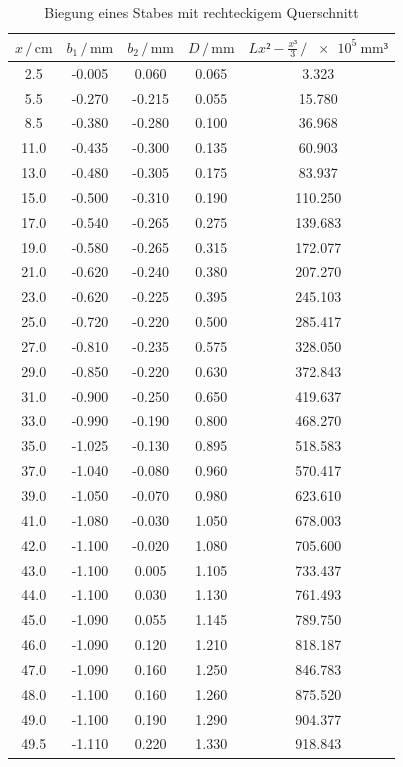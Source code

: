 \begin{table}
\centering
\caption{Biegung eines Stabes mit rechteckigem Querschnitt}
\label{tab:Messdaten1}
\begin{tabular}{c c c c c}
\toprule
$x \,/\, \si{\centi\meter}$ & $b_1 \,/\, \si{\milli\meter}$ & 
$b_2 \,/\, \si{\milli\meter}$ & $D \,/\, \si{\milli\meter}$ &
$Lx²-\frac{x³}{3} \,/\, \SI{e5}{\milli\meter³}$\\
\midrule
 2.5 & -0.005 & 0.060  & 0.065 &   3.323\\
 5.5 & -0.270 & -0.215 & 0.055 &  15.780\\
 8.5 & -0.380 & -0.280 & 0.100 &  36.968\\
11.0 & -0.435 & -0.300 & 0.135 &  60.903\\
13.0 & -0.480 & -0.305 & 0.175 &  83.937\\
15.0 & -0.500 & -0.310 & 0.190 & 110.250\\
17.0 & -0.540 & -0.265 & 0.275 & 139.683\\
19.0 & -0.580 & -0.265 & 0.315 & 172.077\\
21.0 & -0.620 & -0.240 & 0.380 & 207.270\\
23.0 & -0.620 & -0.225 & 0.395 & 245.103\\
25.0 & -0.720 & -0.220 & 0.500 & 285.417\\
27.0 & -0.810 & -0.235 & 0.575 & 328.050\\
29.0 & -0.850 & -0.220 & 0.630 & 372.843\\
31.0 & -0.900 & -0.250 & 0.650 & 419.637\\
33.0 & -0.990 & -0.190 & 0.800 & 468.270\\
35.0 & -1.025 & -0.130 & 0.895 & 518.583\\
37.0 & -1.040 & -0.080 & 0.960 & 570.417\\
39.0 & -1.050 & -0.070 & 0.980 & 623.610\\
41.0 & -1.080 & -0.030 & 1.050 & 678.003\\
42.0 & -1.100 & -0.020 & 1.080 & 705.600\\
43.0 & -1.100 &  0.005 & 1.105 & 733.437\\
44.0 & -1.100 &  0.030 & 1.130 & 761.493\\
45.0 & -1.090 &  0.055 & 1.145 & 789.750\\
46.0 & -1.090 &  0.120 & 1.210 & 818.187\\
47.0 & -1.090 &  0.160 & 1.250 & 846.783\\
48.0 & -1.100 &  0.160 & 1.260 & 875.520\\
49.0 & -1.100 &  0.190 & 1.290 & 904.377\\
49.5 & -1.110 &  0.220 & 1.330 & 918.843\\
\bottomrule
\end{tabular}
\end{table}

